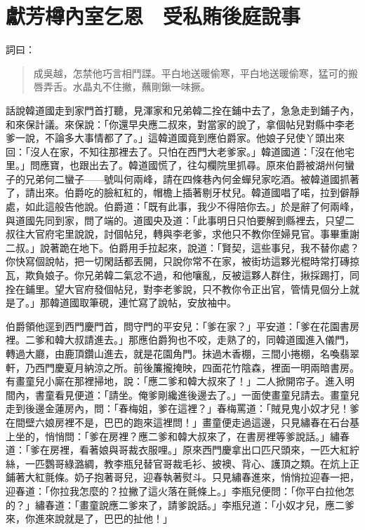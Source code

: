 
\chapter{獻芳樽內室乞恩　受私賄後庭說事}

詞曰：
\begin{quote}
成吳越，怎禁他巧言相鬥諜。平白地送暖偷寒，平白地送暖偷寒，猛可的搬唇弄舌。水晶丸不住撇，蘸剛鍬一味撅。
\end{quote}

話說韓道國走到家門首打聽，見渾家和兄弟韓二拴在鋪中去了，急急走到鋪子內，和來保計議。來保說：「你還早央應二叔來，對當家的說了，拿個帖兒對縣中李老爹一說，不論多大事情都了了。」這韓道國竟到應伯爵家。他娘子兒使丫頭出來回：「沒人在家，不知往那裡去了。只怕在西門大老爹家。」韓道國道：「沒在他宅里。」問應寶，也跟出去了。韓道國慌了，往勾欄院里抓尋。原來伯爵被湖州何蠻子的兄弟何二蠻子——號叫何兩峰，請在四條巷內何金蟬兒家吃酒。被韓道國抓著了，請出來。伯爵吃的臉紅紅的，帽檐上插著剔牙杖兒。韓道國唱了喏，拉到僻靜處，如此這般告他說。伯爵道：「既有此事，我少不得陪你去。」於是辭了何兩峰，與道國先同到家，問了端的。道國央及道：「此事明日只怕要解到縣裡去，只望二叔往大官府宅里說說，討個帖兒，轉與李老爹，求他只不教你侄婦見官。事畢重謝二叔。」說著跪在地下。伯爵用手拉起來，說道：「賢契，這些事兒，我不替你處？你快寫個說帖，把一切閑話都丟開，只說你常不在家，被街坊這夥光棍時常打磚掠瓦，欺負娘子。你兄弟韓二氣忿不過，和他嚷亂，反被這夥人群住，揪採踢打，同拴在鋪里。望大官府發個帖兒，對李老爹說，只不教你令正出官，管情見個分上就是了。」那韓道國取筆硯，連忙寫了說帖，安放袖中。

伯爵領他逕到西門慶門首，問守門的平安兒：「爹在家？」平安道：「爹在花園書房裡。二爹和韓大叔請進去。」那應伯爵狗也不咬，走熟了的，同韓道國進入儀門，轉過大廳，由鹿頂鑽山進去，就是花園角門。抹過木香棚，三間小捲棚，名喚翡翠軒，乃西門慶夏月納涼之所。前後簾攏掩映，四面花竹陰森，裡面一明兩暗書房。有畫童兒小廝在那裡掃地，說：「應二爹和韓大叔來了！」二人掀開帘子。進入明間內，書童看見便道：「請坐。俺爹剛纔進後邊去了。」一面使畫童兒請去。畫童兒走到後邊金蓮房內，問：「春梅姐，爹在這裡？」春梅罵道：「賊見鬼小奴才兒！爹在間壁六娘房裡不是，巴巴的跑來這裡問！」畫童便走過這邊，只見繡春在石台基上坐的，悄悄問：「爹在房裡？應二爹和韓大叔來了，在書房裡等爹說話。」繡春道：「爹在房裡，看著娘與哥裁衣服哩。」原來西門慶拿出口匹尺頭來，一匹大紅紵絲，一匹鸚哥綠潞綢，教李瓶兒替官哥裁毛衫、披襖、背心、護頂之類。在炕上正鋪著大紅氈條。奶子抱著哥兒，迎春執著熨斗。只見繡春進來，悄悄拉迎春一把，迎春道：「你拉我怎麼的？拉撇了這火落在氈條上。」李瓶兒便問：「你平白拉他怎的？」繡春道：「畫童說應二爹來了，請爹說話。」李瓶兒道：「小奴才兒，應二爹來，你進來說就是了，巴巴的扯他！」

